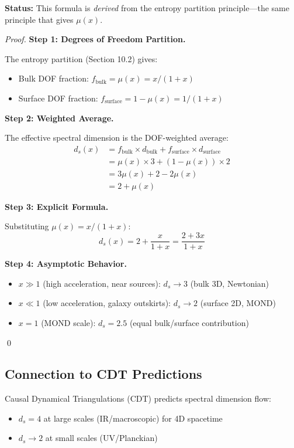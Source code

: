 \documentclass[11pt,a4paper]{article}
\theoremstyle{plain}
\theoremstyle{definition}
\theoremstyle{remark}
\begin{document}
\textbf{Status:} This formula is \emph{derived} from the entropy partition principle---the same principle that gives $\mu(x)$.

\begin{proof}
\textbf{Step 1: Degrees of Freedom Partition.}

The entropy partition (Section 10.2) gives:
\begin{itemize}
  \item Bulk DOF fraction: $f_{\text{bulk}} = \mu(x) = x/(1+x)$
  \item Surface DOF fraction: $f_{\text{surface}} = 1 - \mu(x) = 1/(1+x)$
\end{itemize}

\textbf{Step 2: Weighted Average.}

The effective spectral dimension is the DOF-weighted average:
\begin{align}
d_s(x) &= f_{\text{bulk}} \times d_{\text{bulk}} + f_{\text{surface}} \times d_{\text{surface}} \\
       &= \mu(x) \times 3 + (1-\mu(x)) \times 2 \\
       &= 3\mu(x) + 2 - 2\mu(x) \\
       &= 2 + \mu(x)
\end{align}

\textbf{Step 3: Explicit Formula.}

Substituting $\mu(x) = x/(1+x)$:
\[
d_s(x) = 2 + \frac{x}{1+x} = \frac{2 + 3x}{1 + x}
\]

\textbf{Step 4: Asymptotic Behavior.}
\begin{itemize}
  \item $x \gg 1$ (high acceleration, near sources): $d_s \to 3$ (bulk 3D, Newtonian)
  \item $x \ll 1$ (low acceleration, galaxy outskirts): $d_s \to 2$ (surface 2D, MOND)
  \item $x = 1$ (MOND scale): $d_s = 2.5$ (equal bulk/surface contribution)
\end{itemize}
\qed
\end{proof}

\subsection{Connection to CDT Predictions}

Causal Dynamical Triangulations (CDT) predicts spectral dimension flow:
\begin{itemize}
  \item $d_s = 4$ at large scales (IR/macroscopic) for 4D spacetime
  \item $d_s \to 2$ at small scales (UV/Planckian)
\end{itemize}
\end{document}
